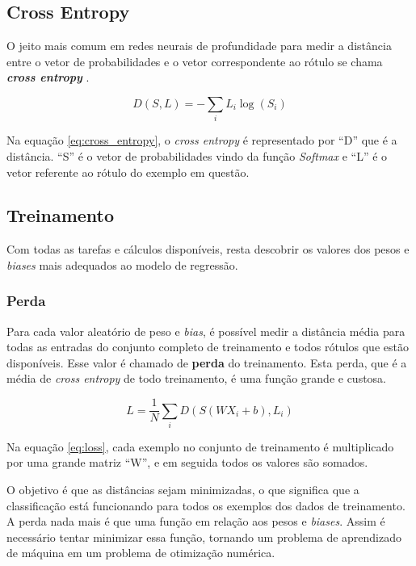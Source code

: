 \subsection{Cross Entropy}

O jeito mais comum em redes neurais de profundidade para medir a
distância entre o vetor de probabilidades e o vetor correspondente ao
rótulo se chama {\bf \emph{cross entropy}}
\cite{Goodfellow-et-al-2016-Book}.

\begin{equation} \label{eq:cross_entropy}
   D(S,L) = - \displaystyle\sum_{i}L_i  {\log (S_i)}
\end{equation}

Na equação \ref{eq:cross_entropy}, o \textit{cross entropy} é
representado por ``D'' que é a distância. ``S'' é o vetor de
probabilidades vindo da função \textit{Softmax} e ``L'' é o vetor
referente ao rótulo do exemplo em questão.

\subsection{Treinamento}

Com todas as tarefas e cálculos disponíveis, resta descobrir os
valores dos pesos e \textit{biases} mais adequados ao modelo de
regressão.

\subsubsection{Perda}

Para cada valor aleatório de peso e \textit{bias}, é possível medir a
distância média para todas as entradas do conjunto completo de
treinamento e todos rótulos que estão disponíveis. Esse valor é
chamado de {\bf perda}\cite{Goodfellow-et-al-2016-Book} do
treinamento. Esta perda, que é a média de \textit{cross entropy} de
todo treinamento, é uma função grande e custosa.

\begin{equation} \label{eq:loss}
  L = \displaystyle\frac{1}{N}\displaystyle\sum_iD(S(WX_i + b), L_i)
\end{equation}

Na equação \ref{eq:loss}, cada exemplo no conjunto de treinamento é
multiplicado por uma grande matriz ``W'', e em seguida todos os
valores são somados.

O objetivo é que as distâncias sejam minimizadas, o que significa que a
classificação está funcionando para todos os exemplos dos dados de
treinamento. A perda nada mais é que uma função em relação aos pesos e
\textit{biases}. Assim é necessário tentar minimizar essa função,
tornando um problema de aprendizado de máquina em um problema de
otimização numérica.

